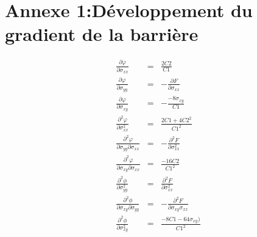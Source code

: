 \section*{Annexe 1:Développement du gradient de la barrière}

\begin{eqnarray*}
\frac{\partial \varphi}{\partial \sigma_{xx}} & = & \frac{2C2}{C1}\\
\frac{\partial \varphi}{\partial \sigma_{yy}} & = & -\frac{\partial F}{\partial \sigma_{xx}} \\
\frac{\partial \varphi}{\partial \sigma_{xy}} & = & -\frac{-8\sigma_{xy}}{C1}\\
\frac{\partial^2 \varphi}{\partial \sigma_{xx}^2} & = & \frac{2C1+4C2^2}{C1^2} \\
\frac{\partial^2 \varphi}{\partial \sigma_{yy}\partial\sigma_{xx}} & = & -\frac{\partial^2 F}{\partial \sigma_{xx}^2}\\
\frac{\partial^2 \varphi}{\partial \sigma_{xy}\partial\sigma_{xx}} & = & \frac{-16C2}{C1^2} \\
\frac{\partial^2 \phi}{\partial \sigma_{yy}^2}& = & \frac{\partial^2 F}{\partial \sigma_{xx}^2}\\
\frac{\partial^2 \phi}{\partial \sigma_{xy}\partial \sigma_{yy}}& = & -\frac{\partial^2 F}{\partial \sigma_{xy}\sigma_{xx}}\\
\frac{\partial^2 \phi}{\partial \sigma_{xy}^2}& = & \frac{-8C1-64\sigma_{xy})}{C1^2}
\end{eqnarray*}